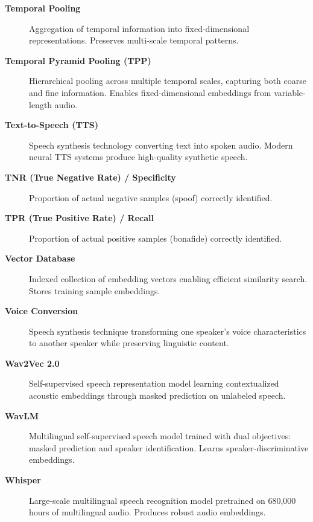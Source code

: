 \begin{description}
    
    \item[\textbf{Temporal Pooling}] 
    Aggregation of temporal information into fixed-dimensional representations. Preserves multi-scale temporal patterns.
    
    \item[\textbf{Temporal Pyramid Pooling (TPP)}] 
    Hierarchical pooling across multiple temporal scales, capturing both coarse and fine information. Enables fixed-dimensional embeddings from variable-length audio.
    
    \item[\textbf{Text-to-Speech (TTS)}] 
    Speech synthesis technology converting text into spoken audio. Modern neural TTS systems produce high-quality synthetic speech.
    
    \item[\textbf{TNR (True Negative Rate) / Specificity}] 
    Proportion of actual negative samples (spoof) correctly identified.
    
    \item[\textbf{TPR (True Positive Rate) / Recall}] 
    Proportion of actual positive samples (bonafide) correctly identified.
    
    \item[\textbf{Vector Database}] 
    Indexed collection of embedding vectors enabling efficient similarity search. Stores training sample embeddings.
    
    \item[\textbf{Voice Conversion}] 
    Speech synthesis technique transforming one speaker's voice characteristics to another speaker while preserving linguistic content.
    
    \item[\textbf{Wav2Vec 2.0}] 
    Self-supervised speech representation model learning contextualized acoustic embeddings through masked prediction on unlabeled speech.
    
    \item[\textbf{WavLM}] 
    Multilingual self-supervised speech model trained with dual objectives: masked prediction and speaker identification. Learns speaker-discriminative embeddings.
    
    \item[\textbf{Whisper}] 
    Large-scale multilingual speech recognition model pretrained on 680,000 hours of multilingual audio. Produces robust audio embeddings.
    
\end{description}

